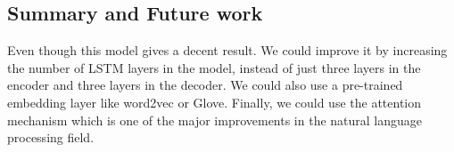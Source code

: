 \documentclass{article}
\begin{document}
\subsection{Summary and Future work}

Even though this model gives a decent result. We could improve it by increasing the number of LSTM layers in the model, instead of just three layers in the encoder and three layers in the decoder. We could also use a pre-trained embedding layer like word2vec or Glove. Finally, we could use the attention mechanism which is one of the major improvements in the natural language processing field.




% 
% 


\end{document}
